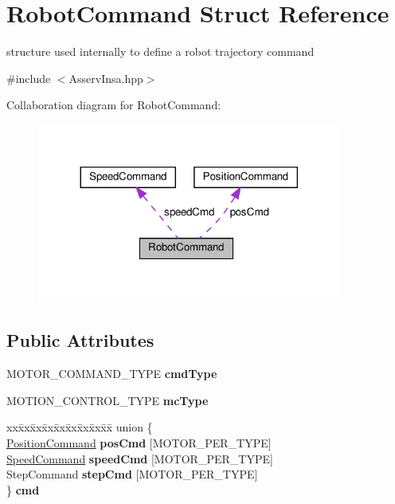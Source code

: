 \hypertarget{structRobotCommand}{}\section{Robot\+Command Struct Reference}
\label{structRobotCommand}


structure used internally to define a robot trajectory command  




{\ttfamily \#include $<$Asserv\+Insa.\+hpp$>$}



Collaboration diagram for Robot\+Command\+:
\nopagebreak
\begin{figure}[H]
\begin{center}
\leavevmode
\includegraphics[width=284pt]{structRobotCommand__coll__graph}
\end{center}
\end{figure}
\subsection*{Public Attributes}
\begin{DoxyCompactItemize}
\item 
\mbox{\label{structRobotCommand_a23247dced08b76adbead322cdd509bfa}} 
M\+O\+T\+O\+R\+\_\+\+C\+O\+M\+M\+A\+N\+D\+\_\+\+T\+Y\+PE {\bfseries cmd\+Type}
\item 
\mbox{\label{structRobotCommand_a1ad710cad025e3ea640bd5887b0ccd0d}} 
M\+O\+T\+I\+O\+N\+\_\+\+C\+O\+N\+T\+R\+O\+L\+\_\+\+T\+Y\+PE {\bfseries mc\+Type}
\item 
\mbox{\label{structRobotCommand_a4810342082bec60000fb612861b4df6b}} 
\begin{tabbing}
xx\=xx\=xx\=xx\=xx\=xx\=xx\=xx\=xx\=\kill
union \{\\
\>\hyperlink{structPositionCommand}{PositionCommand} {\bfseries posCmd} \mbox{[}MOTOR\_PER\_TYPE\mbox{]}\\
\>\hyperlink{structSpeedCommand}{SpeedCommand} {\bfseries speedCmd} \mbox{[}MOTOR\_PER\_TYPE\mbox{]}\\
\>StepCommand {\bfseries stepCmd} \mbox{[}MOTOR\_PER\_TYPE\mbox{]}\\
\} {\bfseries cmd}\\

\end{tabbing}\end{DoxyCompactItemize}


